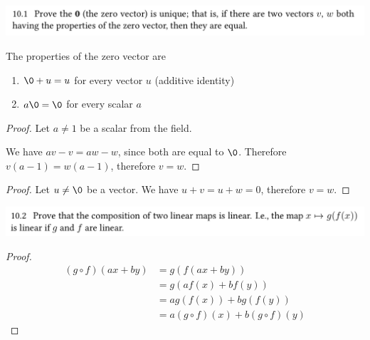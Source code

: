 \begin{mdframed}
\includegraphics[width=400pt]{img/linear-algebra-kun-pimbook-exercises--6242.png}
\end{mdframed}

The properties of the zero vector are
\begin{enumerate}
\item $\0 + u = u$ for every vector $u$ (additive identity)
\item $a\0 = \0$ for every scalar $a$
\end{enumerate}

\begin{proof}
  Let $a \neq 1$ be a scalar from the field.

  We have $av - v = aw - w$, since both are equal to $\0$. Therefore $v(a - 1) = w(a - 1)$, therefore $v = w$.
\end{proof}

\begin{proof}
  Let $u \neq \0$ be a vector. We have $u + v = u + w = 0$, therefore $v = w$.
\end{proof}

\begin{mdframed}
\includegraphics[width=400pt]{img/linear-algebra-kun-pimbook-exercises--f0b5.png}
\end{mdframed}

\begin{proof}
\begin{align*}
  (g \circ f)(ax + by)
  &= g(f(ax + by)) \\
  &= g(af(x) + bf(y)) \\
  &= ag(f(x)) + bg(f(y)) \\
  &= a(g \circ f)(x) + b(g \circ f)(y)
\end{align*}
\end{proof}

